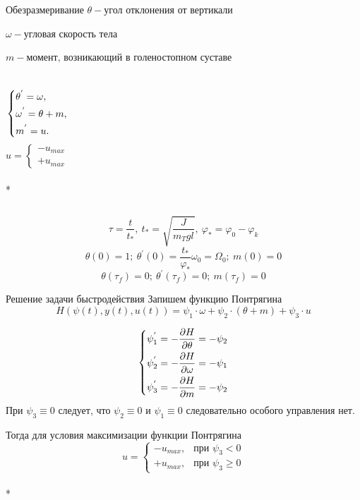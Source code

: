 \documentclass[10pt]{beamer}
\begin{document}
\begin{frame}{Обезразмеривание}
	$\theta - \text{угол отклонения от вертикали}$

	$\omega - \text{угловая скорость тела}$

	$m - \text{момент, возникающий в голеностопном суставе}$


	\begin{columns}
		\begin{equation}\label{basesystem}
			\left\{ {\begin{aligned}
						 & \theta^{'} = \omega , \hfill   \\
						 & \omega^{'} = \theta+m , \hfill \\
						 & m^{'} = u . \hfill             \\
					\end{aligned}} \right.
		\end{equation}
		\[
			u=
			\begin{cases}
				-u_{max} \\
				+u_{max}
			\end{cases}
		\]\\*
	\end{columns}

	\[
		\tau=\frac{t}{t_\ast},\ t_\ast=\sqrt{\frac{J}{m_Tgl}},\ \varphi_\ast=\varphi_0-\varphi_k
	\]
	\[
		\theta(0)=1;\ \theta^{'}(0)=\frac{t_\ast}{\varphi_\ast}\omega_0=\Omega_0;\ m(0)=0
	\]
	\[
		\theta(\tau_f)=0;\ \theta^{'}(\tau_f)=0;\ m(\tau_f)=0
	\]
\end{frame}
\begin{frame}{Решение задачи быстродействия}
	Запишем функцию Понтрягина
	\[
		H(\psi(t),y(t),u(t))=\psi_1\cdot\omega+\psi_2\cdot(\theta+m)+\psi_3\cdot u
	\]

	\begin{equation} \label{7}
		\left\{ {\begin{aligned}
					 & \psi^{'}_1=  - \frac{{\partial H}}{{\partial \theta}} = - \psi_2\hfill  \\
					 & \psi^{'}_2=  - \frac{{\partial H}}{{\partial \omega }} = - \psi_1\hfill \\
					 & \psi^{'}_3=  - \frac{{\partial H}}{{\partial m }} = - \psi_2 \hfill     \\
				\end{aligned}} \right.
	\end{equation}
	При $\psi_3\equiv0$ следует, что $\psi_2\equiv0$ и $\psi_1\equiv0$ следовательно особого управления нет.

	Тогда для условия максимизации функции Понтрягина
	\[
		u=
		\begin{cases}
			-u_{max}, & \text{при $\psi_3<0$}          \\
			+u_{max}, & \text{при $\psi_3\geqslant 0$}
		\end{cases}
	\]\\*
\end{frame}
\end{document}
